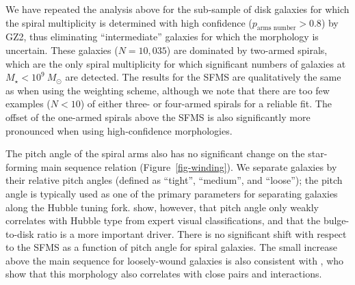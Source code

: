 \documentclass[useAMS,usenatbib]{mn2e}
\begin{document}
{%

We have repeated the analysis above for the sub-sample of disk galaxies for which the spiral multiplicity is determined with high confidence ($p_\textrm{arms~number} > 0.8$) by GZ2, thus eliminating ``intermediate'' galaxies for which the morphology is uncertain. These galaxies ($N=10,035$) are dominated by two-armed spirals, which are the only spiral multiplicity for which significant numbers of galaxies at $M_\star<10^9~M_\odot$ are detected. The results for the SFMS are qualitatively the same as when using the weighting scheme, although we note that there are too few examples ($N<10$) of either three- or four-armed spirals for a reliable fit. The offset of the one-armed spirals above the SFMS is also significantly more pronounced when using high-confidence morphologies.}

The pitch angle of the spiral arms also has no significant change on the star-forming main sequence relation (Figure~\ref{fig-winding}). We separate galaxies by their relative pitch angles (defined as ``tight'', ``medium'', and ``loose''); the pitch angle is typically used as one of the primary parameters for separating galaxies along the Hubble tuning fork. \citet{wil13} show, however, that pitch angle only weakly correlates with Hubble type from expert visual classifications, and that the bulge-to-disk ratio is a more important driver. There is no significant shift with respect to the SFMS as a function of pitch angle for spiral galaxies. The small increase above the main sequence for loosely-wound galaxies is also consistent with \citet{cas13}, who show that this morphology also correlates with close pairs and interactions. 
\end{document}
